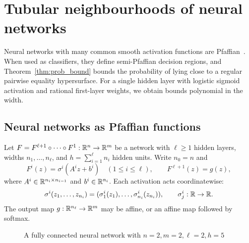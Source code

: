 \section{Tubular neighbourhoods of neural networks}\label{sec:tubular-neural}
Neural networks with many common smooth activation functions are Pfaffian~\cite{karpinski1997polynomial,bianchini2014complexity}. When used as classifiers, they define semi-Pfaffian decision regions, and Theorem~\ref{thm:prob_bound} bounds the probability of lying close to a regular pairwise equality hypersurface. For a single hidden layer with logistic sigmoid activation and rational first-layer weights, we obtain bounds polynomial in the width.

\subsection{Neural networks as Pfaffian functions}
Let $F=F^{\ell+1}\circ\cdots\circ F^1:\mathbb{R}^n\to\mathbb{R}^m$ be a network with $\ell\ge1$ hidden layers, widths $n_1,\dots,n_\ell$, and $h=\sum_{i=1}^\ell n_i$ hidden units. Write $n_0=n$ and
\[
F^i(z)=\sigma^i(A^iz+b^i)\quad(1\le i\le\ell),
\qquad F^{\ell+1}(z)=g(z),
\]
where $A^i\in\mathbb{R}^{n_i\times n_{i-1}}$ and $b^i\in\mathbb{R}^{n_i}$. Each activation acts coordinatewise:
\[
\sigma^i(z_1,\dots,z_{n_i})
=(\sigma^i_1(z_1),\dots,\sigma^i_{n_i}(z_{n_i})),
\qquad \sigma^i_j:\mathbb{R}\to\mathbb{R}.
\]
The output map $g:\mathbb{R}^{n_\ell}\to\mathbb{R}^m$ may be affine, or an affine map followed by softmax.

\begin{figure}[htbp]
\centering
{}
\caption{A fully connected neural network with $n = 2, m=2, \ell = 2, h = 5$}\label{fig:nn}
\end{figure}

